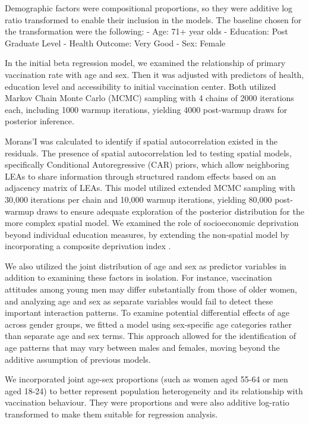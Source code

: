 \documentclass{article}
\begin{document}
Demographic factors were compositional proportions, so they were
additive log ratio transformed to enable their inclusion in the models.
The baseline chosen for the transformation were the following: - Age:
71+ year olds - Education: Post Graduate Level - Health Outcome: Very
Good - Sex: Female

In the initial beta regression model, we examined the relationship of
primary vaccination rate with age and sex. Then it was adjusted with
predictors of health, education level and accessibility to initial
vaccination center. Both utilized Markov Chain Monte Carlo (MCMC)
sampling with 4 chains of 2000 iterations each, including 1000 warmup
iterations, yielding 4000 post-warmup draws for posterior inference.

Morans'I was calculated to identify if spatial autocorrelation existed
in the residuals. The presence of spatial autocorrelation led to testing
spatial models, specifically Conditional Autoregressive (CAR) priors,
which allow neighboring LEAs to share information through structured
random effects based on an adjacency matrix of LEAs. This model utilized
extended MCMC sampling with 30,000 iterations per chain and 10,000
warmup iterations, yielding 80,000 post-warmup draws to ensure adequate
exploration of the posterior distribution for the more complex spatial
model. We examined the role of socioeconomic deprivation beyond
individual education measures, by extending the non-spatial model by
incorporating a composite deprivation index .

We also utilized the joint distribution of age and sex as predictor
variables in addition to examining these factors in isolation. For
instance, vaccination attitudes among young men may differ substantially
from those of older women, and analyzing age and sex as separate
variables would fail to detect these important interaction patterns. To
examine potential differential effects of age across gender groups, we
fitted a model using sex-specific age categories rather than separate
age and sex terms. This approach allowed for the identification of age
patterns that may vary between males and females, moving beyond the
additive assumption of previous models.

We incorporated joint age-sex proportions (such as women aged 55-64 or
men aged 18-24) to better represent population heterogeneity and its
relationship with vaccination behaviour. They were proportions and were
also additive log-ratio transformed to make them suitable for regression
analysis.
\end{document}
